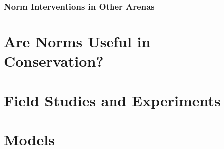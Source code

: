 \documentclass[rutwik_proposal.tex]{subfiles}
\begin{document}
\subsection{Norm Interventions in Other Arenas}\label{subsec:interventions}

\chapter{Are Norms Useful in Conservation?}\label{ch:usefulness}

\chapter{Field Studies and Experiments}\label{ch:field}

\chapter{Models}\label{ch:models}
\end{document}

